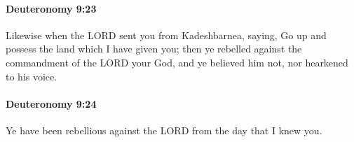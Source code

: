 		\paragraph{Deuteronomy 9:23} %
			\label{DEUTERONOMY-9-23}

			Likewise when the LORD sent you from Kadeshbarnea, saying, Go up and possess the land which I have given you; then ye rebelled against the commandment of the LORD your God, and ye believed him not, nor hearkened to his voice.


		\paragraph{Deuteronomy 9:24} %
			\label{DEUTERONOMY-9-24}

			Ye have been rebellious against the LORD from the day that I knew you.


